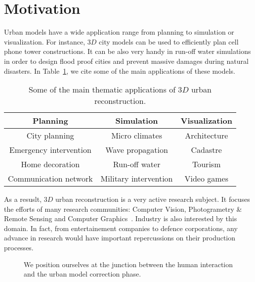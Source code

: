 \documentclass[../main.tex]{subfiles}
\begin{document}
    \section{Motivation}

    Urban models have a wide application range from planning to simulation or visualization. For instance, $3D$ city models can be used to efficiently plan cell phone tower constructions. It can be also very handy in run-off water simulations in order to design flood proof cities and prevent massive damages during natural disasters. In Table~\ref{tab::3d_applications}, we cite some of the main applications of these models.\\

    \begin{table}[H]
        \begin{center}
            \begin{tabular}{c c c}
                \toprule
                Planning & Simulation & Visualization \\
                \midrule
                City planning & Micro climates & Architecture \\
                Emergency intervention & Wave propagation & Cadastre \\
                Home decoration & Run-off water & Tourism \\
                Communication network & Military intervention & Video games \\
                \bottomrule
            \end{tabular}
            \caption{\label{tab::3d_applications} Some of the main thematic applications of $3D$ urban reconstruction\cite{Scholze2002}.}
        \end{center}
    \end{table}

    As a resuslt, $3D$ urban reconstruction is a very active research subject. It focuses the efforts of many research communities: Computer Vision, Photogrametry \& Remote Sensing and Computer Graphics~\cite{Musialski2012}. Industry is also interested by this domain. In fact, from entertainement companies to defence corporations, any advance in research would have  important repercussions on their production processes.\\

    \begin{sidewaysfigure}[p]
        \begin{center}
            
            \caption{\label{fig::situation} We position ourselves at the junction between the human interaction and the urban model correction phase.}
        \end{center}
    \end{sidewaysfigure}
\end{document}
